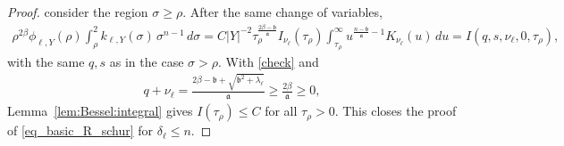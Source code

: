 \documentclass[10pt,a4paper]{amsart}
\begin{document}
\begin{proof}
consider the region $\sigma \ge \rho$. After the same change of variables,
\begin{align*}
\rho^{2\beta}
    \phi_{\ell,Y}(\rho)
    \int_\rho^2
        k_{\ell,Y}(\sigma)\,\sigma^{n-1}\,d\sigma
    =
    C |Y|^{-2}
    \tau_\rho^{\frac{2\beta-\mathfrak b}{\mathfrak a}}
    I_{\nu_\ell}(\tau_\rho)
    \int_{\tau_\rho}^\infty
        u^{\frac{n-\mathfrak b}{\mathfrak a}-1}
        K_{\nu_\ell}(u) \, du = I(q,s,\nu_\ell
        ,0,\tau_\rho),
\end{align*}
with the same $q,s$ as in the case $\sigma>\rho$. With \eqref{check} and 
\begin{align*}
q+\nu_\ell = \frac{2\beta-\mathfrak b + \sqrt{\mathfrak b^2 + \lambda_\ell}}{\mathfrak a} \ge \frac{2\beta}{\mathfrak a}\ge 0,
\end{align*}
Lemma~\ref{lem:Bessel:integral} gives $I(\tau_\rho) \le C$ for all $\tau_\rho >0$. This closes the proof of \eqref{eq_basic_R_schur} for $\delta_\ell\le n$.


\end{proof}
\end{document}
